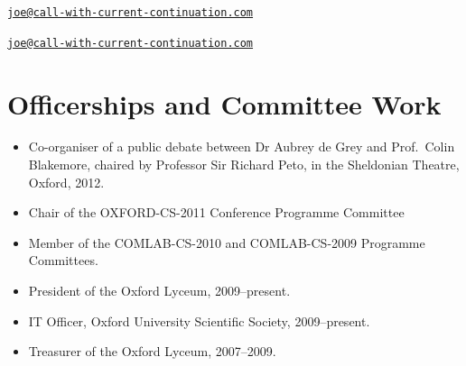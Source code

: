 \documentclass[12pt,twoside,letterpaper]{article}
\begin{document}


\vspace{-6mm}


\vspace{-4mm}


\vspace{-6mm}


\vspace{-6mm}


\newpage


\vspace*{-23mm}\hfill\href{mailto:joe@call-with-current-continuation.com}%
{\nolinkurl{joe@call-with-current-continuation.com}}

\vspace{-12mm}


\vspace{-6.5mm}


\vspace{-6.5mm}


\vspace{-6.5mm}


\vspace{-6.5mm}


\vspace{-4.5mm}


\noindent


\newpage


\vspace*{-23mm}\hfill\href{mailto:joe@call-with-current-continuation.com}%
{\nolinkurl{joe@call-with-current-continuation.com}}

\vspace{-3mm}
\section*{Officerships and Committee Work}
\vspace{-2mm}

\begin{itemize}
	\item Co-organiser of a public debate between Dr Aubrey de Grey
		and Prof.\ Colin Blakemore, chaired by Professor Sir Richard
		Peto, in the Sheldonian Theatre, Oxford, 2012.
	\item Chair of the OXFORD-CS-2011 Conference Programme Committee
	\item Member of the COMLAB-CS-2010 and COMLAB-CS-2009 Programme
		Committees.
	\item President of the Oxford Lyceum, 2009--present.
	\item IT Officer, Oxford University Scientific Society, 2009--present.
	\item Treasurer of the Oxford Lyceum, 2007--2009.
\end{itemize}
\end{document}
